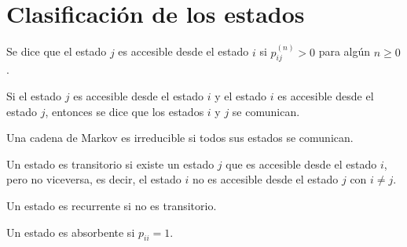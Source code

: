 \section{Clasificación de los estados}

\begin{defi}
Se dice que el estado $j$ es accesible desde el estado $i$ si $p_{ij}^{(n)} > 0$ para algún $n \geq 0$.
\end{defi}

\begin{defi}
Si el estado $j$ es accesible desde el estado $i$ y el estado $i$ es accesible desde el estado $j$, entonces se dice que los estados $i$ y $j$ se comunican.
\end{defi}

\begin{defi}
Una cadena de Markov es irreducible si todos sus estados se comunican.
\end{defi}

\begin{defi}
Un estado es transitorio si existe un estado $j$ que es accesible desde el estado $i$, pero no viceversa, es decir, el estado $i$ no es accesible desde el estado $j$ con $i \neq j$.
\end{defi}

\begin{defi}
Un estado es recurrente si no es transitorio.
\end{defi}

\begin{defi}
Un estado es absorbente si $p_{ii} = 1$.
\end{defi}